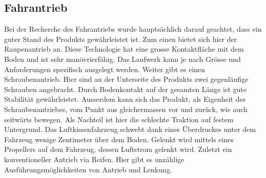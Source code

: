 \subsection{Fahrantrieb}
Bei der Recherche des Fahrantriebs wurde hauptsächlich darauf geachtet, dass ein guter Stand des Produkts gewährleistet ist. Zum einen bietet sich hier der Raupenantrieb an. Diese Technologie hat eine grosse Kontaktfläche mit dem Boden und ist sehr manövrierfähig. Das Laufwerk kann je nach Grösse und Anforderungen spezifisch ausgelegt werden. Weiter gibt es einen Schraubenantrieb. Hier sind an der Unterseite des Produkts zwei gegenläufige Schrauben angebracht. Durch Bodenkontakt auf der gesamten Länge ist gute Stabilität gewährleistet.  Ausserdem kann sich das Produkt, als Eigenheit des Schraubenantriebes, vom Punkt aus gleichermassen vor und zurück, wie auch seitwärts bewegen. Als Nachteil ist hier die schlechte Traktion auf festem Untergrund. Das Luftkissenfahrzeug schwebt dank eines Überdruckes unter dem Fahrzeug wenige Zentimeter über dem Boden. Gelenkt wird mittels eines Propellers auf dem Fahrzeug, dessen Luftstrom gelenkt wird. Zuletzt ein konventioneller Antrieb via Reifen. Hier gibt es unzählige Ausführungsmöglichkeiten von Antrieb und Lenkung. 
